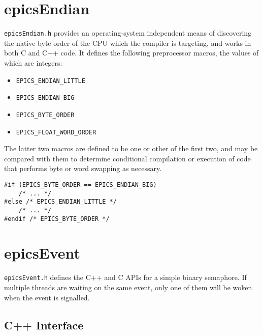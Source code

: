 \section{epicsEndian}

\verb|epicsEndian.h| provides an operating-system independent means of discovering the native byte order of the CPU which the compiler is targeting, and works in both C and C++ code.
It defines the following preprocessor macros, the values of which are integers:

\begin{itemize}
\item \verb|EPICS_ENDIAN_LITTLE|
\item \verb|EPICS_ENDIAN_BIG|
\item \verb|EPICS_BYTE_ORDER|
\item \verb|EPICS_FLOAT_WORD_ORDER|
\end{itemize}

The latter two macros are defined to be one or other of the first two, and may be compared with them to determine conditional compilation or execution of code that performs byte or word swapping as necessary.

\begin{verbatim}
#if (EPICS_BYTE_ORDER == EPICS_ENDIAN_BIG)
    /* ... */
#else /* EPICS_ENDIAN_LITTLE */
    /* ... */
#endif /* EPICS_BYTE_ORDER */
\end{verbatim}

\section{epicsEvent}

\verb|epicsEvent.h| defines the C++ and C APIs for a simple binary semaphore.
If multiple threads are waiting on the same event, only one of them will be woken when the event is signalled.

\subsection{C++ Interface}

